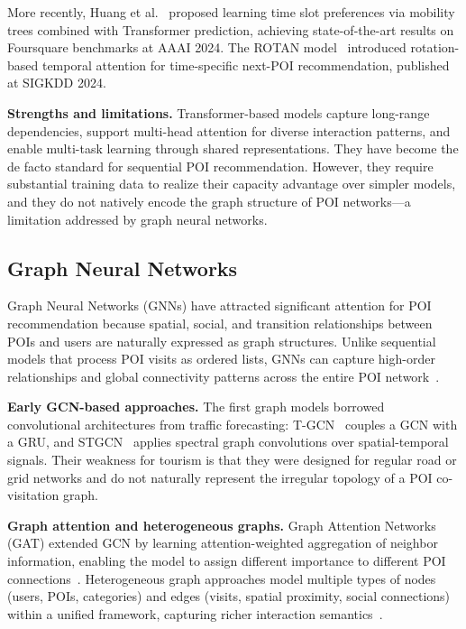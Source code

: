 More recently, Huang et al.~\cite{huang2024timeslot} proposed learning time slot preferences via mobility trees combined with Transformer prediction, achieving state-of-the-art results on Foursquare benchmarks at AAAI 2024. The ROTAN model~\cite{feng2024rotan} introduced rotation-based temporal attention for time-specific next-POI recommendation, published at SIGKDD 2024.

\textbf{Strengths and limitations.} Transformer-based models capture long-range dependencies, support multi-head attention for diverse interaction patterns, and enable multi-task learning through shared representations. They have become the de facto standard for sequential POI recommendation. However, they require substantial training data to realize their capacity advantage over simpler models, and they do not natively encode the graph structure of POI networks---a limitation addressed by graph neural networks.

\subsection{Graph Neural Networks}
\label{sec:sota-dl-gnn}

Graph Neural Networks (GNNs) have attracted significant attention for POI recommendation because spatial, social, and transition relationships between POIs and users are naturally expressed as graph structures. Unlike sequential models that process POI visits as ordered lists, GNNs can capture high-order relationships and global connectivity patterns across the entire POI network~\cite{gnnpoi2024survey}.

\textbf{Early GCN-based approaches.} The first graph models borrowed convolutional architectures from traffic forecasting: T-GCN~\cite{zhao2019tgcn} couples a GCN with a GRU, and STGCN~\cite{yu2018stgcn} applies spectral graph convolutions over spatial-temporal signals. Their weakness for tourism is that they were designed for regular road or grid networks and do not naturally represent the irregular topology of a POI co-visitation graph.

\textbf{Graph attention and heterogeneous graphs.} Graph Attention Networks (GAT) extended GCN by learning attention-weighted aggregation of neighbor information, enabling the model to assign different importance to different POI connections~\cite{velivckovic2018gat}. Heterogeneous graph approaches model multiple types of nodes (users, POIs, categories) and edges (visits, spatial proximity, social connections) within a unified framework, capturing richer interaction semantics~\cite{gnnpoi2024survey}.

